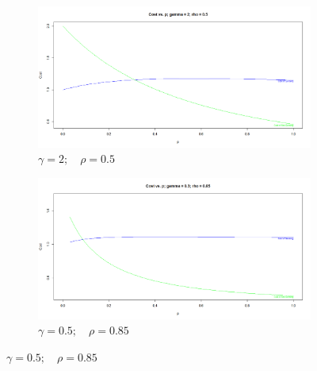 \documentclass[11pt]{article}
\numberwithin{equation}{section}
\begin{document}
\begin{figure}[h!]
	\centering
	\begin{subfigure}[b]{0.49\textwidth}
		\includegraphics[width=\textwidth]{cost_vs_p_2_05}
		\caption{$\gamma=2;\quad\rho=0.5$}
	\label{cost_vs_p_2_05}
	\end{subfigure}
	\begin{subfigure}[b]{0.49\textwidth}
	\includegraphics[width=\textwidth]{cost_vs_p_05_085}
		\caption{$\gamma=0.5;\quad\rho=0.85$}
		\label{cost_vs_p_05_085}
	\end{subfigure}
          

\end{figure}
\end{document}
